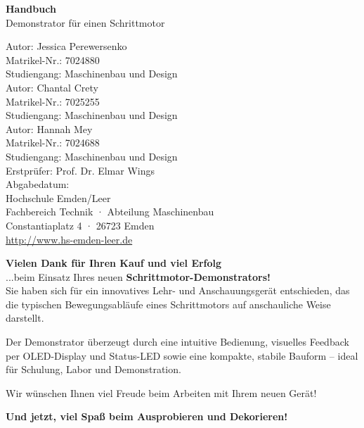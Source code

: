 \documentclass[a4paper,12pt]{report}
\begin{document}
	
	\begin{titlepage}
		\centering
		\vspace*{2cm}
		{\Huge \textbf{Handbuch}}\\[1.5cm]
		{\LARGE Demonstrator für einen Schrittmotor}\\[4cm]
		\begin{flushleft}
			\large
			Autor: Jessica Perewersenko\\
			Matrikel-Nr.: 7024880\\
			Studiengang: Maschinenbau und Design\\[1cm]
			
			Autor: Chantal Crety\\
			Matrikel-Nr.: 7025255\\
			Studiengang: Maschinenbau und Design\\[1cm]
			
			Autor: Hannah Mey\\
			Matrikel-Nr.: 7024688\\
			Studiengang: Maschinenbau und Design\\[1.5cm]
			
			
			Erstprüfer: Prof. Dr. Elmar Wings\\
			Abgabedatum: \\[1.5cm]
			
			Hochschule Emden/Leer\\
			Fachbereich Technik · Abteilung Maschinenbau\\
			Constantiaplatz 4 · 26723 Emden\\
			\url{http://www.hs-emden-leer.de}
		\end{flushleft}
	\end{titlepage}
	
	\vspace*{\fill} %
	\begin{center}
		\begin{tcolorbox}[colback=white!95!gray,
			colframe=black,
			width=0.9\textwidth,
			boxrule=0.5mm,
			arc=2mm,
			auto outer arc,
			drop shadow]
            \textbf{Vielen Dank für Ihren Kauf und viel Erfolg} \\
           ...beim Einsatz Ihres neuen \textbf{Schrittmotor-Demonstrators!}\\

           Sie haben sich für ein innovatives Lehr- und Anschauungsgerät entschieden, das die typischen Bewegungsabläufe eines Schrittmotors auf anschauliche Weise darstellt.  

           Der Demonstrator überzeugt durch eine intuitive Bedienung, visuelles Feedback per OLED-Display und Status-LED sowie eine kompakte, stabile Bauform – ideal für Schulung, Labor und Demonstration.

           Wir wünschen Ihnen viel Freude beim Arbeiten mit Ihrem neuen Gerät!
			
			\medskip
			\centering
			\textbf{Und jetzt, viel Spaß beim Ausprobieren und Dekorieren!}
		\end{tcolorbox}
	\end{center}
	\vspace*{\fill} %
	
\end{document}

